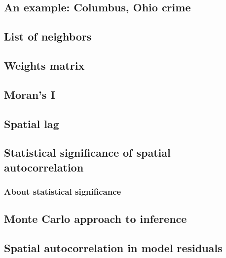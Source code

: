 \documentclass[]{book}
\begin{document}
\hypertarget{an-example-columbus-ohio-crime}{%
\subsection{An example: Columbus, Ohio crime}\label{an-example-columbus-ohio-crime}}

\hypertarget{list-of-neighbors}{%
\subsection{List of neighbors}\label{list-of-neighbors}}

\hypertarget{weights-matrix}{%
\subsection{Weights matrix}\label{weights-matrix}}

\hypertarget{morans-i}{%
\subsection{Moran's I}\label{morans-i}}

\hypertarget{spatial-lag}{%
\subsection{Spatial lag}\label{spatial-lag}}

\hypertarget{statistical-significance-of-spatial-autocorrelation}{%
\subsection{Statistical significance of spatial autocorrelation}\label{statistical-significance-of-spatial-autocorrelation}}

\hypertarget{about-statistical-significance}{%
\subsubsection{About statistical significance}\label{about-statistical-significance}}

\hypertarget{monte-carlo-approach-to-inference}{%
\subsection{Monte Carlo approach to inference}\label{monte-carlo-approach-to-inference}}

\hypertarget{spatial-autocorrelation-in-model-residuals}{%
\subsection{Spatial autocorrelation in model residuals}\label{spatial-autocorrelation-in-model-residuals}}
\end{document}
